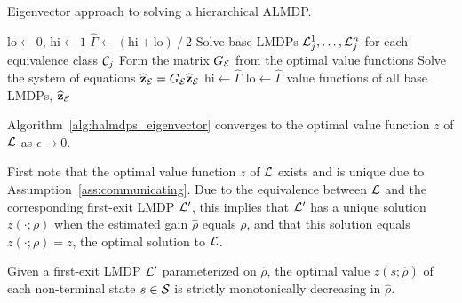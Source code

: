 \begin{algorithm}[!b]
  \caption{Eigenvector approach to solving a hierarchical ALMDP.}
  \begin{algorithmic}[1]

    \State $\text{lo}\gets 0$, $\text{hi}\gets 1$
    \State $\widehat\Gamma \gets (\text{hi} + \text{lo}) \mathbin{/} 2$
    \State Solve base LMDPs $\mathcal{L}_j^1,\ldots,\mathcal{L}_j^n$ for each equivalence class $\mathcal{C}_j$
    \State Form the matrix $G_{\mathcal{E}}$ from the optimal value functions
    \State Solve the system of equations  ${\bf \widehat z_{\mathcal{E}}} = G_{\mathcal{E}} {\bf\widehat z_{\mathcal{E}}}$
    \State $\text{hi}\gets \widehat\Gamma$
    \Else \State $\text{lo}\gets \widehat\Gamma$
    \EndIf
    \vspace*{3pt}
    \EndWhile
    \State \Return value functions of all base LMDPs, ${\bf \widehat z_{\mathcal{E}}}$
  \end{algorithmic}
  \label{alg:halmdps_eigenvector}
\end{algorithm}

\begin{theorem}\label{thm:converge}
    Algorithm~\ref{alg:halmdps_eigenvector} converges to the optimal value function $z$ of $\mathcal{L}$ as $\epsilon\to 0$.
\end{theorem}

First note that the optimal value function $z$ of $\mathcal{L}$ exists and is unique due to Assumption~\ref{ass:communicating}. Due to the equivalence between $\mathcal{L}$ and the corresponding first-exit LMDP $\mathcal{L}'$, this implies that $\mathcal{L}'$ has a unique solution $z(\cdot;\rho)$ when the estimated gain $\widehat\rho$ equals $\rho$, and that this solution equals $z(\cdot;\rho)=z$, the optimal solution to $\mathcal{L}$.

\begin{lemma}\label{lemma:monotonicity}
     Given a first-exit LMDP $\mathcal{L}'$ parameterized on $\widehat\rho$, the optimal value $z(s;\widehat\rho)$ of each non-terminal state $s\in\mathcal{S}$ is strictly monotonically decreasing in $\widehat\rho$.
\end{lemma}

